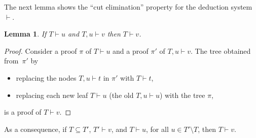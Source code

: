 \documentclass[acmtocl,acmnow]{acmtrans2m}
\newtheorem{lemma}[theorem]{Lemma}
\begin{document}
The next lemma shows the ``cut elimination'' property for the deduction system $\vdash$.
\begin{lemma}\label{lemma_deduc-cutelim}
If $T\vdash u$ and $T,u\vdash v$ then $T\vdash v$.
\end{lemma}
\begin{proof}
Consider a proof $\pi$ of $T\vdash u$ and a proof $\pi'$ of $T,u\vdash v$. The tree obtained from~$\pi'$ by
\begin{itemize}
\item
replacing the nodes $T,u\vdash t$ in $\pi'$ with $T\vdash t$,
\item
replacing each new leaf $T\vdash u$ (the old $T,u\vdash u$) with the tree $\pi$,
\end{itemize}
is a proof of $T\vdash v$.
\end{proof}

As a consequence,  if $T\subseteq T'$, $T'\vdash v$, and $T\vdash u$, for all $u\in T'\setminus T$, then $T\vdash v$.

\smallskip
\end{document}
